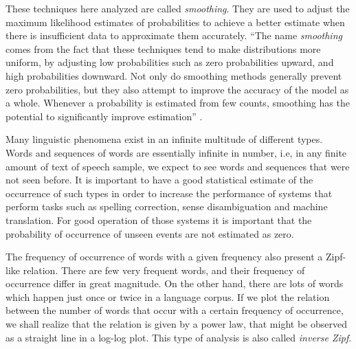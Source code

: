 These techniques here analyzed are called \emph{smoothing}. They are used to adjust the maximum 
likelihood estimates of probabilities to achieve a better estimate when there is insufficient data to 
approximate them accurately. ``The name \emph{smoothing} comes from the fact that these techniques
tend to make distributions more uniform, by adjusting low probabilities such as zero probabilities
upward, and high probabilities downward. Not only do smoothing methods generally prevent zero
probabilities, but they also attempt to improve the accuracy of the model as a whole. Whenever
a probability is estimated from few counts, smoothing has the potential to significantly improve
estimation'' \citep{chen98}.
 


Many linguistic phenomena exist in an infinite multitude of different types. Words and sequences of words
are essentially infinite in number, i.e, in any finite amount of text of speech sample, we expect
to see words and sequences that were not seen before. It is important to have a good statistical estimate
of the occurrence of such types in order to increase the performance of systems that perform tasks such as 
spelling correction, sense disambiguation and machine translation. For good operation of those systems 
it is important that the probability of occurrence of unseen events are not estimated as zero.

The frequency of occurrence of words with a given frequency also present a Zipf-like relation.
There are few very frequent words, and their frequency of occurrence differ in great magnitude.
On the other hand, there are lots of words which happen just once or twice in a language corpus.
If we plot the relation between the number of words that occur with a certain frequency
of occurrence, we shall realize that the relation is given by a power law, that might be 
observed as a straight line in a log-log plot. This type of analysis is also called 
\textit{inverse Zipf}.


